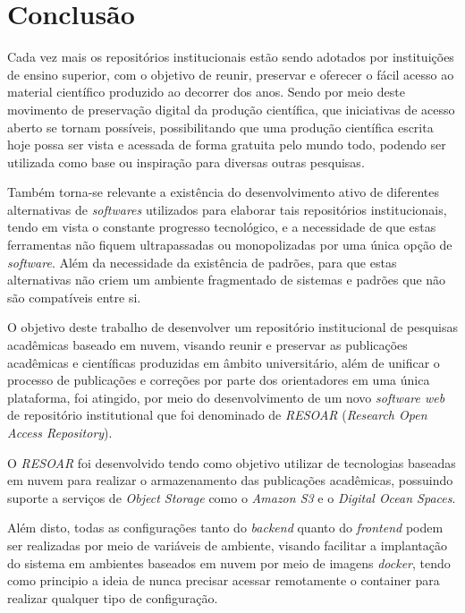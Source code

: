 \chapter*{Conclusão} \label{chap:concl}

Cada vez mais os repositórios institucionais estão sendo adotados por instituições de
ensino superior, com o objetivo de reunir, preservar e oferecer o fácil acesso ao material
científico produzido ao decorrer dos anos. Sendo por meio deste movimento de preservação
digital da produção científica, que iniciativas de acesso aberto se tornam possíveis,
possibilitando que uma produção científica escrita hoje possa ser vista e acessada
de forma gratuita pelo mundo todo, podendo ser utilizada como base ou inspiração para
diversas outras pesquisas.

Também torna-se relevante a existência do desenvolvimento ativo de diferentes
alternativas de \emph{softwares} utilizados para elaborar tais repositórios
institucionais, tendo em vista o constante progresso tecnológico, e a necessidade
de que estas ferramentas não fiquem ultrapassadas ou monopolizadas por uma única
opção de \emph{software}. Além da necessidade da existência de padrões, para que
estas alternativas não criem um ambiente fragmentado de sistemas e padrões que não
são compatíveis entre si.

O objetivo deste trabalho de desenvolver um repositório institucional de pesquisas
acadêmicas baseado em nuvem, visando reunir e preservar as publicações acadêmicas
e científicas produzidas em âmbito universitário, além de unificar o processo
de publicações e correções por parte dos orientadores em uma única plataforma,
foi atingido, por meio do desenvolvimento de um novo \emph{software web} de
repositório institutional que foi denominado de \emph{RESOAR}
(\emph{Research Open Access Repository}).

O \emph{RESOAR} foi desenvolvido tendo como objetivo utilizar de tecnologias baseadas
em nuvem para realizar o armazenamento das publicações acadêmicas, possuindo suporte
a serviços de \emph{Object Storage} como o \emph{Amazon S3} e o \emph{Digital Ocean Spaces}.

Além disto, todas as configurações tanto do \emph{backend} quanto do \emph{frontend}
podem ser realizadas por meio de variáveis de ambiente, visando facilitar a implantação
do sistema em ambientes baseados em nuvem por meio de imagens \emph{docker}, tendo como
principio a ideia de nunca precisar acessar remotamente o container para realizar qualquer
tipo de configuração.

